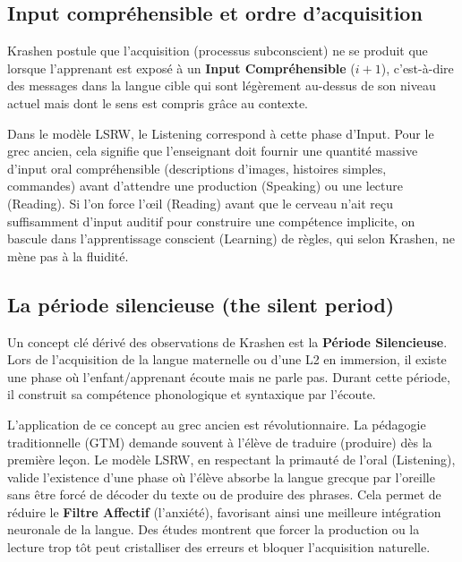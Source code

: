 \subsection{Input compréhensible et ordre d'acquisition}

Krashen postule que l'acquisition (processus subconscient) ne se produit que lorsque l'apprenant est
exposé à un \textbf{Input Compréhensible} ($i+1$), c'est-à-dire des messages dans la langue cible
qui sont légèrement au-dessus de son niveau actuel mais dont le sens est compris grâce au
contexte.\cite{III-2-1-ref42}

Dans le modèle LSRW, le \og Listening\fg{} correspond à cette phase d'Input. Pour le grec ancien,
cela signifie que l'enseignant doit fournir une quantité massive d'input oral compréhensible
(descriptions d'images, histoires simples, commandes) avant d'attendre une production (Speaking) ou
une lecture (Reading). Si l'on force l'œil (Reading) avant que le cerveau n'ait reçu suffisamment
d'input auditif pour construire une compétence implicite, on bascule dans l'apprentissage conscient
(Learning) de règles, qui selon Krashen, ne mène pas à la fluidité.\cite{III-2-1-ref41}



\subsection{La période silencieuse (the silent period)}

Un concept clé dérivé des observations de Krashen est la \textbf{Période
Silencieuse}.\cite{III-2-1-ref44} Lors de l'acquisition de la langue maternelle ou d'une L2 en
immersion, il existe une phase où l'enfant/apprenant écoute mais ne parle pas. Durant cette période,
il construit sa compétence phonologique et syntaxique par l'écoute.

L'application de ce concept au grec ancien est révolutionnaire. La pédagogie traditionnelle (GTM)
demande souvent à l'élève de traduire (produire) dès la première leçon. Le modèle LSRW, en
respectant la primauté de l'oral (Listening), valide l'existence d'une phase où l'élève absorbe la
langue grecque par l'oreille sans être forcé de décoder du texte ou de produire des phrases. Cela
permet de réduire le \textbf{Filtre Affectif} (l'anxiété), favorisant ainsi une meilleure
intégration neuronale de la langue.\cite{III-2-1-ref46} Des études montrent que forcer la production
ou la lecture trop tôt peut cristalliser des erreurs et bloquer l'acquisition
naturelle.\cite{III-2-1-ref49}



